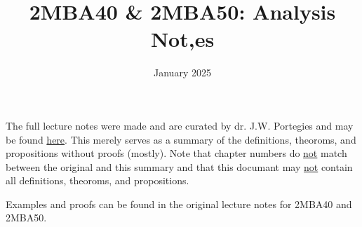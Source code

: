 \documentclass[fleqn]{article}
\title{2MBA40 \& 2MBA50: Analysis Not,es}
\author{}
\date{January 2025}
\newcommand{\ul}[1]{\underline{#1}}
\begin{document}
\maketitle

The full lecture notes were made and are curated by dr. J.W. Portegies and may be found
\href{https://gitlab.tue.nl/jim-portegies/analysis}{here}. This merely
serves as a summary of the definitions, theoroms, and propositions
without proofs (mostly). Note that chapter numbers do \ul{not} match between
the original and this summary and that this documant may \ul{not} contain
all definitions, theoroms, and propositions.

Examples and proofs can be found in the original lecture notes for 2MBA40 and 2MBA50.













\end{document}
